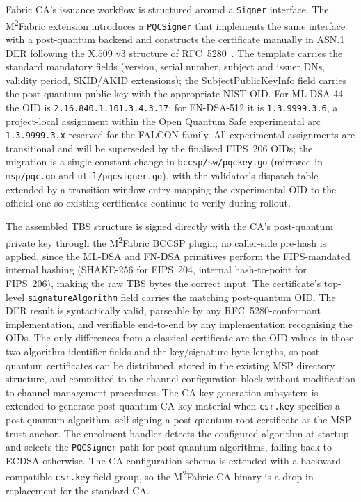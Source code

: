 \documentclass{ieeetj}
\newcommand{\mfabric}{M\textsuperscript{2}Fabric}
\begin{document}
Fabric CA's issuance workflow is structured around a \texttt{Signer} interface.
The \mfabric{} extension introduces a \texttt{PQCSigner} that implements the same
interface with a post-quantum backend and constructs the certificate manually in
ASN.1 DER following the X.509 v3 structure of RFC~5280~\cite{rfc5280}. The
template carries the standard mandatory fields (version, serial number, subject
and issuer DNs, validity period, SKID/AKID extensions); the SubjectPublicKeyInfo
field carries the post-quantum public key with the appropriate NIST OID. For
ML-DSA-44 the OID is \texttt{2.16.840.1.101.3.4.3.17}; for FN-DSA-512 it is
\texttt{1.3.9999.3.6}, a project-local assignment within the Open Quantum Safe
experimental arc \texttt{1.3.9999.3.x} reserved for the FALCON family. All
experimental assignments are transitional and will be superseded by the
finalised FIPS~206 OIDs; the migration is a single-constant change in
\texttt{bccsp/sw/pqckey.go} (mirrored in \texttt{msp/pqc.go} and
\texttt{util/pqcsigner.go}), with the validator's dispatch table extended by a
transition-window entry mapping the experimental OID to the official one so
existing certificates continue to verify during rollout.

The assembled TBS structure is signed directly with the CA's post-quantum
private key through the \mfabric{} BCCSP plugin; no caller-side pre-hash is
applied, since the ML-DSA and FN-DSA primitives perform the FIPS-mandated
internal hashing (SHAKE-256 for FIPS~204, internal hash-to-point for FIPS~206),
making the raw TBS bytes the correct input. The certificate's top-level
\texttt{signatureAlgorithm} field carries the matching post-quantum OID. The DER
result is syntactically valid, parseable by any RFC~5280-conformant
implementation, and verifiable end-to-end by any implementation recognising the
OIDs. The only differences from a classical certificate are the OID values in
those two algorithm-identifier fields and the key/signature byte lengths, so
post-quantum certificates can be distributed, stored in the existing MSP
directory structure, and committed to the channel configuration block without
modification to channel-management procedures. The CA key-generation subsystem
is extended to generate post-quantum CA key material when \texttt{csr.key}
specifies a post-quantum algorithm, self-signing a post-quantum root certificate
as the MSP trust anchor. The enrolment handler detects the configured algorithm
at startup and selects the \texttt{PQCSigner} path for post-quantum algorithms,
falling back to ECDSA otherwise. The CA configuration schema is extended with a
backward-compatible \texttt{csr.key} field group, so the \mfabric{} CA binary is
a drop-in replacement for the standard CA.
\end{document}
